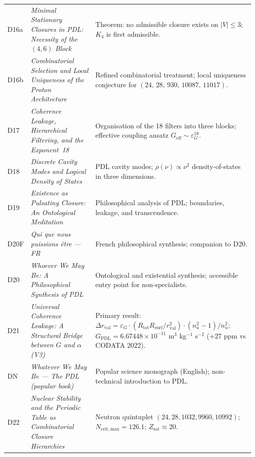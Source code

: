 \documentclass[11pt,a4paper]{article}
\theoremstyle{plain}
\theoremstyle{definition}
\theoremstyle{remark}
\newcommand{\Kfour}{K_4}
\newcommand{\quintuplet}{(24,\,28,\,930,\,10087,\,11017)}
\newcommand{\Geff}{G_{\mathrm{eff}}}
\newcommand{\GPDL}{G_{\mathrm{PDL}}}
\newcommand{\epsG}{\varepsilon_G}
\newcommand{\rval}{r_{\mathrm{val}}}
\begin{document}
\begin{longtable}{@{}L{1.3cm}L{3.8cm}L{8.0cm}@{}}
D16a & \textit{Minimal Stationary Closures in PDL: Necessity of the $(4,6)$ Block}~\citep{D16a} & \textcolor{proofblue}{Theorem}: no admissible closure exists on $|V|\leq 3$; $\Kfour$ is first admissible. \\[0.3em]

D16b & \textit{Combinatorial Selection and Local Uniqueness of the Proton Architecture}~\citep{D16b} & Refined combinatorial treatment; local uniqueness conjecture for $\quintuplet$. \\[0.3em]

D17 & \textit{Coherence Leakage, Hierarchical Filtering, and the Exponent~18}~\citep{D17} & Organisation of the 18 filters into three blocks; effective coupling ansatz $\Geff\sim\epsG^{18}$. \\[0.3em]

D18 & \textit{Discrete Cavity Modes and Logical Density of States}~\citep{D18} & PDL cavity modes; $\rho(\nu)\propto\nu^2$ density-of-states in three dimensions. \\[0.3em]

D19 & \textit{Existence as Pulsating Closure: An Ontological Meditation}~\citep{D19} & Philosophical analysis of PDL; boundaries, leakage, and transcendence. \\[0.3em]

D20F & \textit{Qui que nous puissions \^etre — FR}~\citep{D20F} & French philosophical synthesis; companion to D20. \\[0.3em]

D20 & \textit{Whoever We May Be: A Philosophical Synthesis of PDL}~\citep{D20} & Ontological and existential synthesis; accessible entry point for non-specialists. \\[0.3em]

D21 & \textit{Universal Coherence Leakage: A Structural Bridge between $G$ and $\alpha$ (V3)}~\citep{D21} & \textcolor{proofblue}{Primary result}: $\Delta\rval = \epsG\cdot(R_{\mathrm{tot}}R_{\mathrm{surf}}/\rval^2)\cdot(n_u^2-1)/n_u^2$; $\GPDL = 6.67448\times 10^{-11}$ m$^3$ kg$^{-1}$ s$^{-2}$ ($+27$ ppm vs CODATA 2022). \\[0.3em]

DN & \textit{Whatever We May Be — The PDL (popular book)}~\citep{DN} & Popular science monograph (English); non-technical introduction to PDL. \\[0.3em]

D22 & \textit{Nuclear Stability and the Periodic Table as Combinatorial Closure Hierarchies}~\citep{D22} & Neutron quintuplet $(24,28,1032,9960,10992)$; $N_{\mathrm{crit,max}}=126.1$; $Z_{\mathrm{sat}}\approx 20$. \\[0.3em]


\end{longtable}
\end{document}

